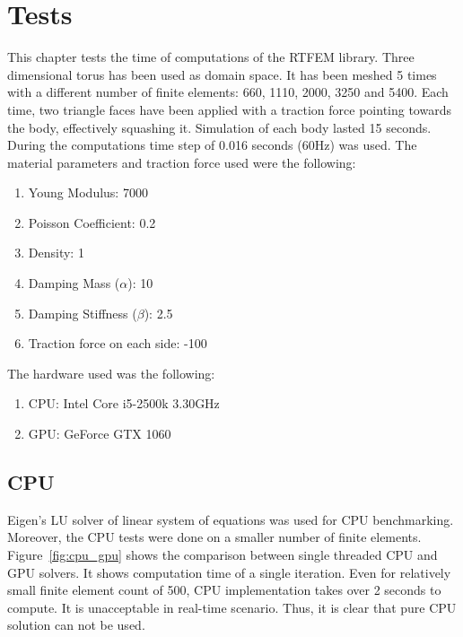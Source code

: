 \documentclass[en]{minipw} %
\begin{document}

\chapter{Tests}
\label{chap:tests}
This chapter tests the time of computations of the RTFEM library. Three dimensional torus has been used as domain space. It has been meshed 5 times with a different number of finite elements: 660, 1110, 2000, 3250 and 5400. Each time, two triangle faces have been applied with a traction force pointing towards the body, effectively squashing it. Simulation of each body lasted 15 seconds. During the computations time step of 0.016 seconds (60Hz) was used. The material parameters and traction force used were the following:
\begin{enumerate}
\item Young Modulus: 7000
\item Poisson Coefficient: 0.2
\item Density: 1
\item Damping Mass ($\alpha$): 10
\item Damping Stiffness ($\beta$): 2.5
\item Traction force on each side: -100
\end{enumerate}

The hardware used was the following:
\begin{enumerate}
\item CPU: Intel Core i5-2500k 3.30GHz
\item GPU: GeForce GTX 1060
\end{enumerate}

\section{CPU}

Eigen's LU solver of linear system of equations was used for CPU benchmarking. Moreover, the CPU tests were done on a smaller number of finite elements. Figure~\ref{fig:cpu_gpu} shows the comparison between single threaded CPU and GPU solvers. It shows computation time of a single iteration. Even for relatively small finite element count of 500, CPU implementation takes over 2 seconds to compute. It is unacceptable in real-time scenario. Thus, it is clear that pure CPU solution can not be used.
\end{document}
